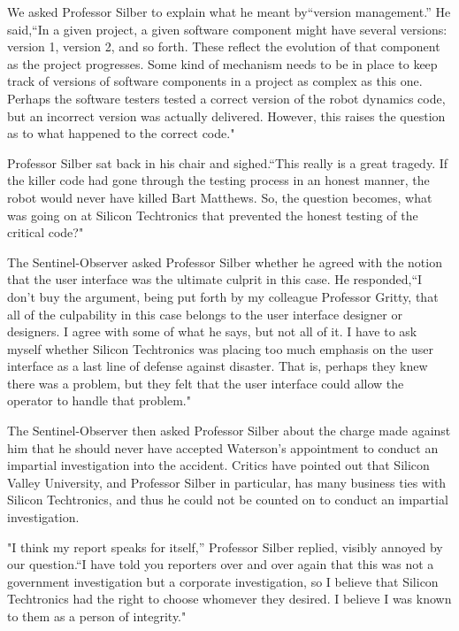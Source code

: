 We asked Professor Silber to explain what he meant by``version management.'' He said,``In a given project, a given software component might have several versions: version 1, version 2, and so forth. These reflect the evolution of that component as the project progresses. Some kind of mechanism needs to be in place to keep track of versions of software components in a project as complex as this one. Perhaps the software testers tested a correct version of the robot dynamics code, but an incorrect version was actually delivered. However, this raises the question as to what happened to the correct code."

Professor Silber sat back in his chair and sighed.``This really is a great tragedy. If the killer code had gone through the testing process in an honest manner, the robot would never have killed Bart Matthews. So, the question becomes, what was going on at Silicon Techtronics that prevented the honest testing of the critical code?"

The Sentinel-Observer asked Professor Silber whether he agreed with the notion that the user interface was the ultimate culprit in this case. He responded,``I don't buy the argument, being put forth by my colleague Professor Gritty, that all of the culpability in this case belongs to the user interface designer or designers. I agree with some of what he says, but not all of it. I have to ask myself whether Silicon Techtronics was placing too much emphasis on the user interface as a last line of defense against disaster. That is, perhaps they knew there was a problem, but they felt that the user interface could allow the operator to handle that problem."

The Sentinel-Observer then asked Professor Silber about the charge made against him that he should never have accepted Waterson's appointment to conduct an impartial investigation into the accident. Critics have pointed out that Silicon Valley University, and Professor Silber in particular, has many business ties with Silicon Techtronics, and thus he could not be counted on to conduct an impartial investigation.

"I think my report speaks for itself,'' Professor Silber replied, visibly annoyed by our question.``I have told you reporters over and over again that this was not a government investigation but a corporate investigation, so I believe that Silicon Techtronics had the right to choose whomever they desired. I believe I was known to them as a person of integrity."

